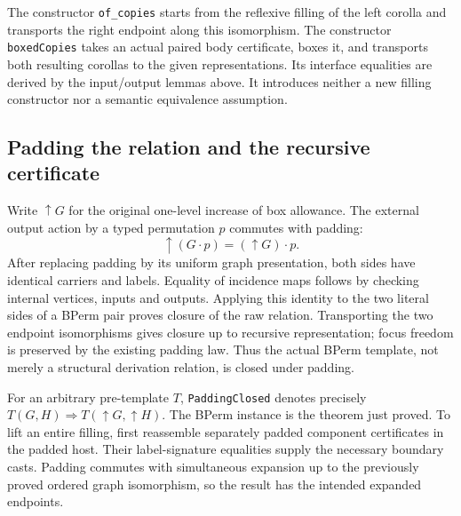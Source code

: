 
The constructor \texttt{of\_copies} starts from the reflexive filling of the
left corolla and transports the right endpoint along this isomorphism.
The constructor \texttt{boxedCopies} takes an actual paired body certificate,
boxes it, and transports both resulting corollas to the given representations.
Its interface equalities are derived by the input/output lemmas above.
It introduces neither a new filling constructor nor a semantic equivalence
assumption.


\subsection{Padding the relation and the recursive certificate}
Write $\uparrow G$ for the original one-level increase of box allowance.
The external output action by a typed permutation $p$ commutes with padding:
\[
 \uparrow(G\cdot p)=(\uparrow G)\cdot p.
\]
After replacing padding by its uniform graph presentation, both sides have
identical carriers and labels. Equality of incidence maps follows by checking
internal vertices, inputs and outputs. Applying this identity to the two
literal sides of a BPerm pair proves closure of the raw relation.
Transporting the two endpoint isomorphisms gives closure up to recursive
representation; focus freedom is preserved by the existing padding law.
Thus the actual BPerm template, not merely a structural derivation relation,
is closed under padding.


For an arbitrary pre-template $T$, \texttt{PaddingClosed} denotes precisely
$T(G,H)\Rightarrow T(\uparrow G,\uparrow H)$. The BPerm instance is the theorem
just proved. To lift an entire filling, first reassemble separately padded
component certificates in the padded host. Their label-signature equalities
supply the necessary boundary casts. Padding commutes with simultaneous
expansion up to the previously proved ordered graph isomorphism, so the
result has the intended expanded endpoints.

